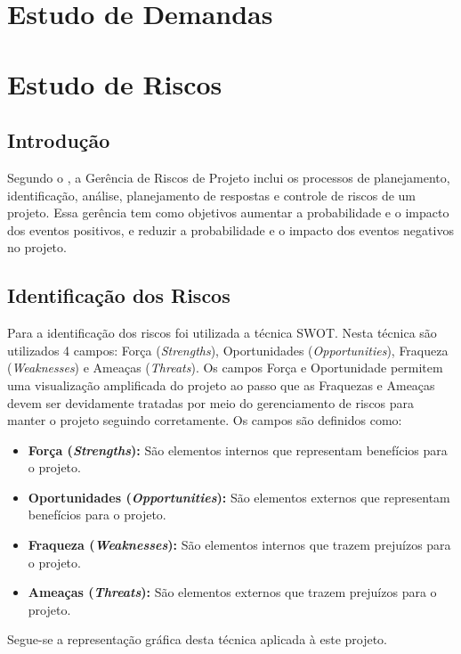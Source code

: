 \chapter{Estudo de Demandas}

\chapter{Estudo de Riscos}
\section{Introdução}
Segundo o \cite{pmbok}  , a Gerência de Riscos de Projeto inclui os processos de planejamento, identificação,
análise, planejamento de respostas e controle de riscos de um projeto. Essa gerência tem como objetivos aumentar a
probabilidade e o impacto dos eventos positivos, e reduzir a probabilidade e o impacto dos eventos negativos no projeto.

\section{Identificação dos Riscos}
Para a identificação dos riscos foi utilizada a técnica SWOT. Nesta técnica são utilizados 4 campos: Força (\textit{Strengths}),
 Oportunidades (\textit{Opportunities}), Fraqueza (\textit{Weaknesses}) e Ameaças (\textit{Threats}). Os campos Força e Oportunidade permitem uma
 visualização amplificada do projeto ao passo que as Fraquezas e Ameaças devem ser devidamente tratadas por meio do
 gerenciamento de riscos para manter o projeto seguindo corretamente. Os campos são definidos como:

\begin{itemize}
  \item \textbf{Força (\textit{Strengths}):} São elementos internos que representam benefícios para o projeto.
  \item \textbf{Oportunidades (\textit{Opportunities}):} São elementos externos que representam benefícios para o projeto.
  \item \textbf{Fraqueza (\textit{Weaknesses}):} São elementos internos que trazem prejuízos para o projeto.
  \item \textbf{Ameaças (\textit{Threats}):} São elementos externos que trazem prejuízos para o projeto.
\end{itemize}

Segue-se a representação gráfica desta técnica aplicada à este projeto.

\pagebreak

